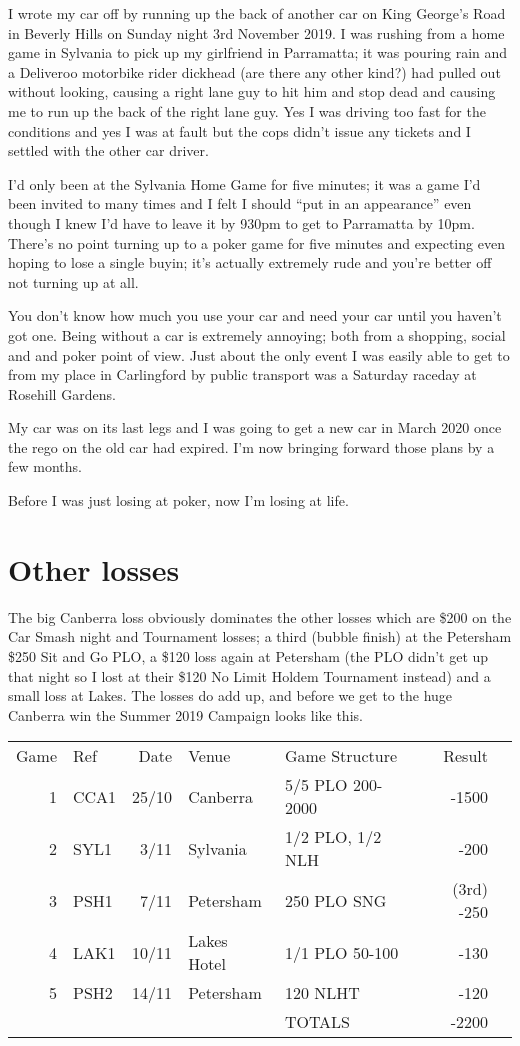 I wrote my car off by running up the back of another car on King
George's Road in Beverly Hills on Sunday night 3rd November 2019.
I was rushing from a home game in Sylvania to pick up my girlfriend in
Parramatta; it was pouring rain and a Deliveroo motorbike
rider dickhead (are there any other kind?) had pulled out without
looking, causing a right lane guy to hit him and stop dead and causing
me to run up the back of the right lane guy. Yes I was driving too
fast for the conditions and yes I was at fault but the cops didn't
issue any tickets and I settled with the other car driver.

I'd only been at the Sylvania Home Game for five minutes; it was a
game I'd been invited to many times and I felt I should ``put in an
appearance'' even though I knew I'd have to leave it by 930pm to get
to Parramatta by 10pm. There's no point turning up to a poker game for
five minutes and expecting even hoping to lose a single buyin; it's
actually extremely rude and you're better off not turning up at all.

You don't know how much you use your car and need your car until you
haven't got one. Being without a car is extremely annoying; both from
a shopping, social and and poker point of view. Just about the only
event I was easily able to get to from my place in Carlingford by
public transport was a Saturday raceday at Rosehill Gardens.

My car was on its last legs and I was going to get a new car in March
2020 once the rego on the old car had expired. I'm now bringing
forward those plans by a few months.

Before I was just losing at poker, now I'm losing at life.

\section*{Other losses}

The big Canberra loss obviously dominates the other losses which are
\$200 on the Car Smash night and Tournament losses; a third (bubble
finish) at the Petersham \$250 Sit and Go PLO, a \$120 loss again at
Petersham (the PLO didn't get up that night so I lost at their \$120
No Limit Holdem Tournament instead) and a small loss at Lakes. The
losses do add up, and before we get to the huge Canberra win the
Summer 2019 Campaign looks like this.

\begin{tabular}{rlrllrr}
 Game & Ref & Date & Venue & Game Structure & Result \\
  1  &   CCA1    & 25/10 & Canberra & 5/5 PLO 200-2000 & -1500 \\
  2  &   SYL1    &  3/11 & Sylvania & 1/2 PLO, 1/2 NLH &  -200 \\
  3  &   PSH1    &  7/11 & Petersham & 250 PLO SNG & (3rd) -250 \\
  4  &   LAK1    & 10/11 & Lakes Hotel & 1/1 PLO 50-100 &  -130 \\
  5  &   PSH2    & 14/11 & Petersham & 120 NLHT & -120 \\
     &           &       &           & TOTALS & -2200  \\
\end{tabular}

